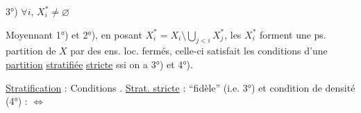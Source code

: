 3°) $\forall i$, $X_i^*\ne\varnothing$


Moyennant 1°) et 2°), en posant $X_i^*=X_i\setminus\bigcup_{j<i}X_j^*$,
les $X_i^*$ forment une ps. partition  de $X$ par des
ens. loc. fermés, celle-ci satisfait les conditions
d'une \uline{partition} \uline{stratifiée} \uline{stricte}  ssi
on a 3°) et 4°).

\uline{Stratification} : Conditions . \uline{Strat. stricte} : ``fidèle'' (i.e.
3°) et condition de densité (4°) :  $\Longleftrightarrow$ 

